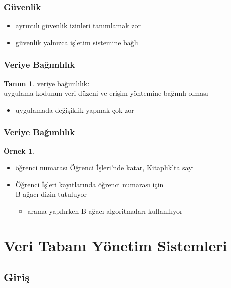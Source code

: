 \documentclass[dvipsnames]{beamer}
\theoremstyle{definition}
\newtheorem{tanim}[theorem]{Tanım}
\theoremstyle{example}
\newtheorem{ornek}[theorem]{Örnek}
\theoremstyle{plain}
\begin{document}
\begin{frame}
  \frametitle{Güvenlik}

  \begin{itemize}
    \item ayrıntılı güvenlik izinleri tanımlamak zor
    \item güvenlik yalnızca işletim sistemine bağlı
  \end{itemize}
\end{frame}

\begin{frame}
  \frametitle{Veriye Bağımlılık}

  \begin{tanim}
    \alert{veriye bağımlılık}:\\
      uygulama kodunun veri düzeni ve erişim yöntemine bağımlı olması

    \begin{itemize}
      \item uygulamada değişiklik yapmak çok zor
    \end{itemize}
  \end{tanim}
\end{frame}

\begin{frame}
  \frametitle{Veriye Bağımlılık}

  \begin{ornek}
    \begin{itemize}
      \item öğrenci numarası Öğrenci İşleri'nde katar, Kitaplık'ta sayı

      \pause
      \medskip
      \item Öğrenci İşleri kayıtlarında öğrenci numarası için\\
        B-ağacı dizin tutuluyor
      \begin{itemize}
        \item arama yapılırken B-ağacı algoritmaları kullanılıyor
      \end{itemize}
    \end{itemize}
  \end{ornek}
\end{frame}

\section{Veri Tabanı Yönetim Sistemleri}

\subsection{Giriş}
\end{document}
